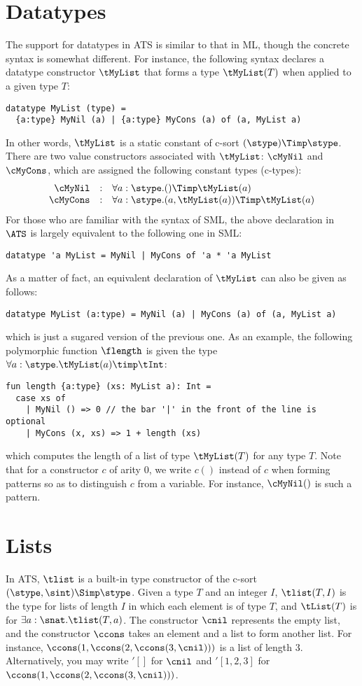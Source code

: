 \section{Datatypes}
The support for datatypes in ATS is similar to that in ML, though the
concrete syntax is somewhat different.  For instance, the following syntax
declares a datatype constructor $\tMyList$ that forms a type $\tMyList(T)$
when applied to a given type $T$:
\begin{verbatim}
datatype MyList (type) =
  {a:type} MyNil (a) | {a:type} MyCons (a) of (a, MyList a)
\end{verbatim}
In other words, $\tMyList$ is a static constant of c-sort
$(\stype)\Timp\stype$.  There are two value constructors associated with
$\tMyList$: $\cMyNil$ and $\cMyCons$, which are assigned the following
constant types (c-types):
\[\begin{array}{rcl}
\cMyNil & : & \forall a:\stype. ()\Timp \tMyList(a) \\
\cMyCons & : & \forall a:\stype. (a, \tMyList(a))\Timp \tMyList(a) \\
\end{array}\]
For those who are familiar with the syntax of SML, the above declaration in
$\ATS$ is largely equivalent to the following one in SML:
\begin{verbatim}
datatype 'a MyList = MyNil | MyCons of 'a * 'a MyList
\end{verbatim}
As a matter of fact, an equivalent declaration of $\tMyList$ can
also be given as follows:
\begin{verbatim}
datatype MyList (a:type) = MyNil (a) | MyCons (a) of (a, MyList a)
\end{verbatim}
which is just a sugared version of the previous one.  As an example, the
following polymorphic function $\flength$ is given the type $\forall
a:\stype.\tMyList(a)\timp\tInt$:
\begin{verbatim}
fun length {a:type} (xs: MyList a): Int =
  case xs of
    | MyNil () => 0 // the bar '|' in the front of the line is optional
    | MyCons (x, xs) => 1 + length (xs)
\end{verbatim}
which computes the length of a list of type $\tMyList(T)$ for any type $T$.
Note that for a constructor $c$ of arity $0$, we write $c()$ instead of $c$
when forming patterns so as to distinguish $c$ from a variable. For
instance, $\cMyNil()$ is such a pattern.

\section{Lists}
In ATS, $\tlist$ is a built-in type constructor of the c-sort $(\stype,
\sint)\Simp\stype$. Given a type $T$ and an integer $I$, $\tlist(T, I)$ is
the type for lists of length $I$ in which each element is of type $T$, and
$\tList(T)$ is for $\exists a:\snat.\tlist(T, a)$.  The constructor $\cnil$
represents the empty list, and the constructor $\ccons$ takes an element
and a list to form another list. For instance, $\ccons (1, \ccons (2,
\ccons (3,
\cnil)))$ is a list of length $3$.  Alternatively, you may write $'[]$ for
$\cnil$ and $'[1,2,3]$ for $\ccons (1, \ccons (2, \ccons (3, \cnil)))$.

